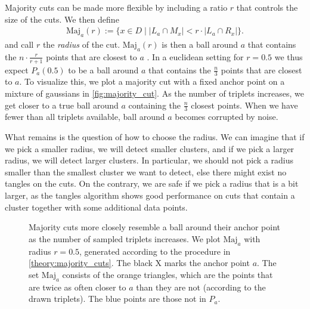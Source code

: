 Majority cuts can be made more flexible by including a ratio $r$ that controls the size of the cuts. 
We then define 
\begin{align*}
\text{Maj}_a(r) := \{x \in D \mid \left|   L_a \cap M_x\right| < r \cdot \left| L_a \cap R_x \right| \}
.\end{align*}
and call $r$ the \textit{radius} of the cut. 
$\text{Maj} _a(r)$ is then a ball around $a$ that contains the $n \cdot \frac{r}{r+1}$ points that are closest to $a$ . In a euclidean setting for 
$r = 0.5$ we thus expect $P_a(0.5)$ to be a ball around $a$ that contains the $\frac{n}{3}$ points that are closest to $a$. To visualize this, we plot a majority cut with a fixed anchor point on a 
mixture of gaussians in \autoref{fig:majority_cut}. 
As the number of triplets increases, we get closer to a true ball around $a$ containing the $\frac{n}{3}$ closest points. 
When we have fewer than all triplets available, ball around $a$ becomes corrupted by noise.

What remains is the question of how to choose the radius. We can imagine that if we pick a smaller radius, we will detect smaller clusters, and if we pick a larger radius, we will detect larger
clusters. 
In particular, we should not pick a radius smaller than the smallest cluster we want to detect, else there might exist no tangles on the cuts. 
On the contrary, we are safe if we pick a radius that is a bit larger, as the tangles algorithm shows good performance on cuts that contain a cluster together with some additional data points.

\onecolumn
\begin{figure}[ht]
    \centering
    \subfloat[500 (0.47\%) triplets]{%
      \resizebox{0.5\textwidth}{!}{}
  }
    \subfloat[5000 (4.7\%) triplets]{%
      \resizebox{0.5\textwidth}{!}{}}
    \hfill
    \subfloat[20000 (18.8\%) triplets]{%
      \resizebox{0.5\textwidth}{!}{}}
    \subfloat[106200 (100\%) triplets]{%
      \resizebox{0.5\textwidth}{!}{}}
    \caption{Majority cuts more closely resemble a ball around their anchor point as the number of 
        sampled triplets increases. 
        We plot $\text{Maj}_a$ with radius $r=0.5$, generated according to the procedure in \autoref{theory:majority_cuts}. The black X marks the anchor point $a$. 
        The set $\text{Maj}_a$ consists of the orange triangles, which are the points that are twice as often closer to $a$ than they are not (according to the drawn triplets). 
        The blue points are those not in $P_a$.}
    \label{fig:majority_cut}
\end{figure}
